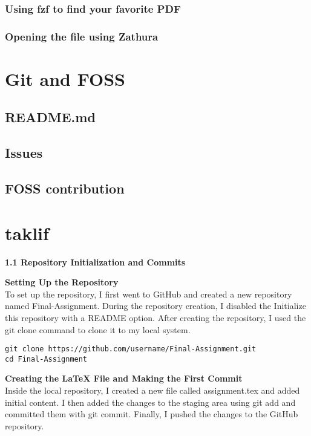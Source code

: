 \documentclass{article}
\begin{document}
\subsubsection{Using fzf to find your favorite PDF}
\subsubsection{Opening the file using Zathura}

\section{Git and FOSS}
\subsection{README.md}
\subsection{Issues}
\subsection{FOSS contribution}





\newpage








\section*{taklif}

\textbf{1.1 Repository Initialization and Commits}

\textbf{Setting Up the Repository} \\
To set up the repository, I first went to GitHub and created a new repository named Final-Assignment. During the repository creation, I disabled the Initialize this repository with a README option. After creating the repository, I used the git clone command to clone it to my local system.

\begin{verbatim}
git clone https://github.com/username/Final-Assignment.git
cd Final-Assignment
\end{verbatim}

\textbf{Creating the LaTeX File and Making the First Commit} \\
Inside the local repository, I created a new file called assignment.tex and added initial content. I then added the changes to the staging area using git add and committed them with git commit. Finally, I pushed the changes to the GitHub repository.
\end{document}
